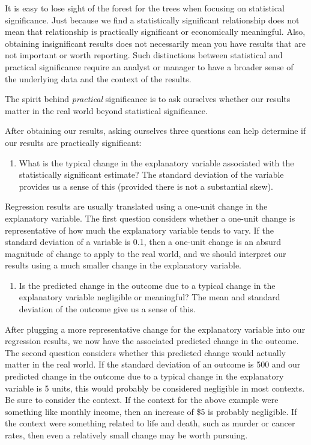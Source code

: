 \documentclass[
]{book}
\providecommand{\tightlist}{%
  \setlength{\itemsep}{0pt}\setlength{\parskip}{0pt}}
\begin{document}
It is easy to lose sight of the forest for the trees when focusing on statistical significance. Just because we find a statistically significant relationship does not mean that relationship is practically significant or economically meaningful. Also, obtaining insignificant results does not necessarily mean you have results that are not important or worth reporting. Such distinctions between statistical and practical significance require an analyst or manager to have a broader sense of the underlying data and the context of the results.

The spirit behind \emph{practical} significance is to ask ourselves whether our results matter in the real world beyond statistical significance.

After obtaining our results, asking ourselves three questions can help determine if our results are practically significant:

\begin{enumerate}
\def\labelenumi{\arabic{enumi}.}
\tightlist
\item
  What is the typical change in the explanatory variable associated with the statistically significant estimate? The standard deviation of the variable provides us a sense of this (provided there is not a substantial skew).
\end{enumerate}

Regression results are usually translated using a one-unit change in the explanatory variable. The first question considers whether a one-unit change is representative of how much the explanatory variable tends to vary. If the standard deviation of a variable is 0.1, then a one-unit change is an absurd magnitude of change to apply to the real world, and we should interpret our results using a much smaller change in the explanatory variable.

\begin{enumerate}
\def\labelenumi{\arabic{enumi}.}
\setcounter{enumi}{1}
\tightlist
\item
  Is the predicted change in the outcome due to a typical change in the explanatory variable negligible or meaningful? The mean and standard deviation of the outcome give us a sense of this.
\end{enumerate}

After plugging a more representative change for the explanatory variable into our regression results, we now have the associated predicted change in the outcome. The second question considers whether this predicted change would actually matter in the real world. If the standard deviation of an outcome is 500 and our predicted change in the outcome due to a typical change in the explanatory variable is 5 units, this would probably be considered negligible in most contexts. Be sure to consider the context. If the context for the above example were something like monthly income, then an increase of \$5 is probably negligible. If the context were something related to life and death, such as murder or cancer rates, then even a relatively small change may be worth pursuing.
\end{document}
